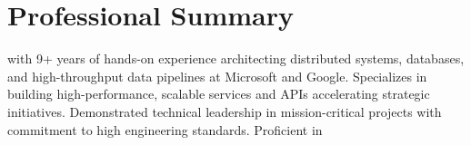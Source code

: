 
\section{Professional Summary}

\normalsize{\POSITION{} with 9+ years of hands-on experience architecting distributed \lowercase{\BackEnd} systems, databases, and high-throughput data pipelines at Microsoft and Google. Specializes in building high-performance, scalable services and APIs accelerating strategic initiatives. Demonstrated technical leadership in mission-critical projects with commitment to high engineering standards. Proficient in \LanguagesOrderSummary}